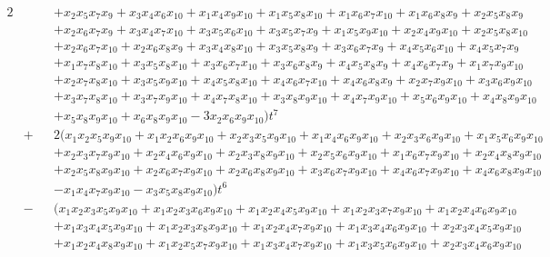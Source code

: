 \documentclass[12pt]{article}
\begin{document}
{\begin{alignat*}{2}
& && +x_{2}x_{5}x_{7}x_{9}+x_{3}x_{4}x_{6}x_{10}+x_{1}x_{4}x_{9}x_{10}+x_{1}x_{5}x_{8}x_{10}+x_{1}x_{6}x_{7}x_{10}+x_{1}x_{6}x_{8}x_{9}+x_{2}x_{5}x_{8}x_{9} \\
& && +x_{2}x_{6}x_{7}x_{9}+x_{3}x_{4}x_{7}x_{10}+x_{3}x_{5}x_{6}x_{10}+x_{3}x_{5}x_{7}x_{9}+x_{1}x_{5}x_{9}x_{10}+x_{2}x_{4}x_{9}x_{10}+x_{2}x_{5}x_{8}x_{10} \\
& && +x_{2}x_{6}x_{7}x_{10}+x_{2}x_{6}x_{8}x_{9}+x_{3}x_{4}x_{8}x_{10}+x_{3}x_{5}x_{8}x_{9}+x_{3}x_{6}x_{7}x_{9}+x_{4}x_{5}x_{6}x_{10}+x_{4}x_{5}x_{7}x_{9} \\
& && +x_{1}x_{7}x_{8}x_{10}+x_{3}x_{5}x_{8}x_{10}+x_{3}x_{6}x_{7}x_{10}+x_{3}x_{6}x_{8}x_{9}+x_{4}x_{5}x_{8}x_{9}+x_{4}x_{6}x_{7}x_{9}+x_{1}x_{7}x_{9}x_{10} \\
& && +x_{2}x_{7}x_{8}x_{10}+x_{3}x_{5}x_{9}x_{10}+x_{4}x_{5}x_{8}x_{10}+x_{4}x_{6}x_{7}x_{10}+x_{4}x_{6}x_{8}x_{9}+x_{2}x_{7}x_{9}x_{10}+x_{3}x_{6}x_{9}x_{10} \\
& && +x_{3}x_{7}x_{8}x_{10}+x_{3}x_{7}x_{9}x_{10}+x_{4}x_{7}x_{8}x_{10}+x_{3}x_{8}x_{9}x_{10}+x_{4}x_{7}x_{9}x_{10}+x_{5}x_{6}x_{9}x_{10}+x_{4}x_{8}x_{9}x_{10}\\
& && +x_{5}x_{8}x_{9}x_{10}+x_{6}x_{8}x_{9}x_{10}-3x_{2}x_{6}x_{9}x_{10})t^{7} \\ 
& + && 2(x_{1}x_{2}x_{5}x_{9}x_{10}+x_{1}x_{2}x_{6}x_{9}x_{10}+x_{2}x_{3}x_{5}x_{9}x_{10}+x_{1}x_{4}x_{6}x_{9}x_{10}+x_{2}x_{3}x_{6}x_{9}x_{10}+x_{1}x_{5}x_{6}x_{9}x_{10} \\
& && +x_{2}x_{3}x_{7}x_{9}x_{10}+x_{2}x_{4}x_{6}x_{9}x_{10}+x_{2}x_{3}x_{8}x_{9}x_{10}+x_{2}x_{5}x_{6}x_{9}x_{10}+x_{1}x_{6}x_{7}x_{9}x_{10}+x_{2}x_{4}x_{8}x_{9}x_{10} \\
& && +x_{2}x_{5}x_{8}x_{9}x_{10}+x_{2}x_{6}x_{7}x_{9}x_{10}+x_{2}x_{6}x_{8}x_{9}x_{10}+x_{3}x_{6}x_{7}x_{9}x_{10}+x_{4}x_{6}x_{7}x_{9}x_{10}+x_{4}x_{6}x_{8}x_{9}x_{10} \\
& && -x_{1}x_{4}x_{7}x_{9}x_{10}-x_{3}x_{5}x_{8}x_{9}x_{10}) t^6 \\
& - && (x_{1}x_{2}x_{3}x_{5}x_{9}x_{10}+x_{1}x_{2}x_{3}x_{6}x_{9}x_{10}+x_{1}x_{2}x_{4}x_{5}x_{9}x_{10}+x_{1}x_{2}x_{3}x_{7}x_{9}x_{10}+x_{1}x_{2}x_{4}x_{6}x_{9}x_{10}\\ 
& && +x_{1}x_{3}x_{4}x_{5}x_{9}x_{10}+x_{1}x_{2}x_{3}x_{8}x_{9}x_{10}+x_{1}x_{2}x_{4}x_{7}x_{9}x_{10}+x_{1}x_{3}x_{4}x_{6}x_{9}x_{10}+x_{2}x_{3}x_{4}x_{5}x_{9}x_{10}\\
& && +x_{1}x_{2}x_{4}x_{8}x_{9}x_{10}+x_{1}x_{2}x_{5}x_{7}x_{9}x_{10}+x_{1}x_{3}x_{4}x_{7}x_{9}x_{10}+x_{1}x_{3}x_{5}x_{6}x_{9}x_{10}+x_{2}x_{3}x_{4}x_{6}x_{9}x_{10}\\

\end{alignat*}}
\end{document}
